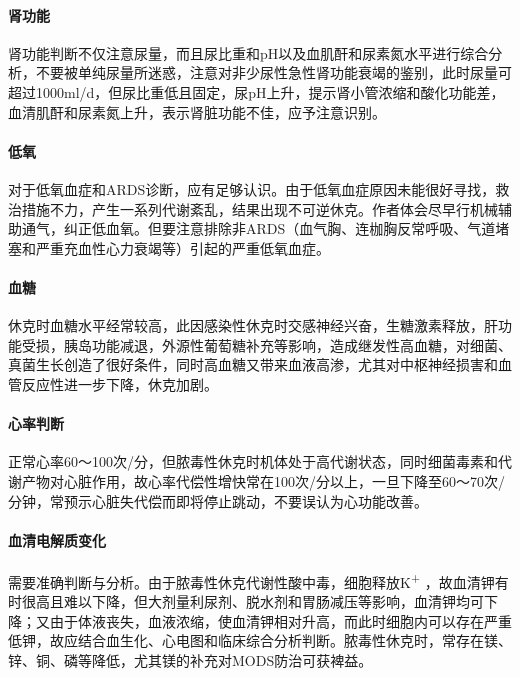 \paragraph{肾功能}

肾功能判断不仅注意尿量，而且尿比重和pH以及血肌酐和尿素氮水平进行综合分析，不要被单纯尿量所迷惑，注意对非少尿性急性肾功能衰竭的鉴别，此时尿量可超过1000ml/d，但尿比重低且固定，尿pH上升，提示肾小管浓缩和酸化功能差，血清肌酐和尿素氮上升，表示肾脏功能不佳，应予注意识别。

\paragraph{低氧}

对于低氧血症和ARDS诊断，应有足够认识。由于低氧血症原因未能很好寻找，救治措施不力，产生一系列代谢紊乱，结果出现不可逆休克。作者体会尽早行机械辅助通气，纠正低血氧。但要注意排除非ARDS（血气胸、连枷胸反常呼吸、气道堵塞和严重充血性心力衰竭等）引起的严重低氧血症。

\paragraph{血糖}

休克时血糖水平经常较高，此因感染性休克时交感神经兴奋，生糖激素释放，肝功能受损，胰岛功能减退，外源性葡萄糖补充等影响，造成继发性高血糖，对细菌、真菌生长创造了很好条件，同时高血糖又带来血液高渗，尤其对中枢神经损害和血管反应性进一步下降，休克加剧。

\paragraph{心率判断}

正常心率60～100次/分，但脓毒性休克时机体处于高代谢状态，同时细菌毒素和代谢产物对心脏作用，故心率代偿性增快常在100次/分以上，一旦下降至60～70次/分钟，常预示心脏失代偿而即将停止跳动，不要误认为心功能改善。

\paragraph{血清电解质变化}

需要准确判断与分析。由于脓毒性休克代谢性酸中毒，细胞释放K\textsuperscript{+}
，故血清钾有时很高且难以下降，但大剂量利尿剂、脱水剂和胃肠减压等影响，血清钾均可下降；又由于体液丧失，血液浓缩，使血清钾相对升高，而此时细胞内可以存在严重低钾，故应结合血生化、心电图和临床综合分析判断。脓毒性休克时，常存在镁、锌、铜、磷等降低，尤其镁的补充对MODS防治可获裨益。

